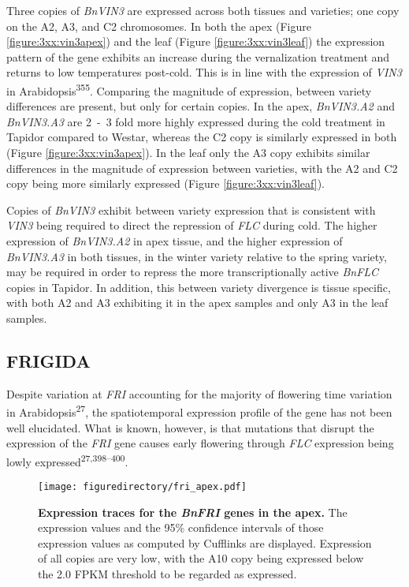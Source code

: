 \documentclass[12pt,]{book}
\begin{document}
Three copies of \emph{BnVIN3} are expressed across both tissues and
varieties; one copy on the A2, A3, and C2 chromosomes. In both the apex
(Figure \ref{figure:3xx:vin3apex}) and the leaf (Figure
\ref{figure:3xx:vin3leaf}) the expression pattern of the gene exhibits
an increase during the vernalization treatment and returns to low
temperatures post-cold. This is in line with the expression of
\emph{VIN3} in Arabidopsis\textsuperscript{355}. Comparing the magnitude
of expression, between variety differences are present, but only for
certain copies. In the apex, \emph{BnVIN3.A2} and \emph{BnVIN3.A3} are
2~-~3 fold more highly expressed during the cold treatment in Tapidor
compared to Westar, whereas the C2 copy is similarly expressed in both
(Figure \ref{figure:3xx:vin3apex}). In the leaf only the A3 copy
exhibits similar differences in the magnitude of expression between
varieties, with the A2 and C2 copy being more similarly expressed
(Figure \ref{figure:3xx:vin3leaf}).

Copies of \emph{BnVIN3} exhibit between variety expression that is
consistent with \emph{VIN3} being required to direct the repression of
\emph{FLC} during cold. The higher expression of \emph{BnVIN3.A2} in
apex tissue, and the higher expression of \emph{BnVIN3.A3} in both
tissues, in the winter variety relative to the spring variety, may be
required in order to repress the more transcriptionally active
\emph{BnFLC} copies in Tapidor. In addition, this between variety
divergence is tissue specific, with both A2 and A3 exhibiting it in the
apex samples and only A3 in the leaf samples.

\subsection{FRIGIDA}\label{section:winter:fri}

Despite variation at \emph{FRI} accounting for the majority of flowering
time variation in Arabidopsis\textsuperscript{27}, the spatiotemporal
expression profile of the gene has not been well elucidated. What is
known, however, is that mutations that disrupt the expression of the
\emph{FRI} gene causes early flowering through \emph{FLC} expression
being lowly expressed\textsuperscript{27,398--400}.

\begin{figure}[htbp]
\centering
\texttt{[image: figuredirectory/fri\_apex.pdf]}
\caption{\textbf{Expression traces for the \emph{BnFRI} genes in the
apex.} The expression values and the 95\% confidence intervals of those
expression values as computed by Cufflinks are displayed. Expression of
all copies are very low, with the A10 copy being expressed below the 2.0
FPKM threshold to be regarded as expressed.}\label{figure:3xx:friapex}
\end{figure}
\end{document}
